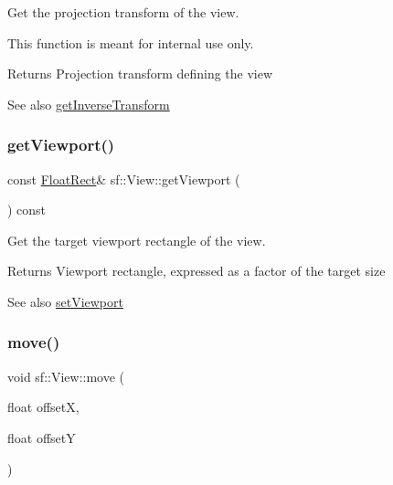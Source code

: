 Get the projection transform of the view. 

This function is meant for internal use only.

\begin{DoxyReturn}{Returns}
Projection transform defining the view
\end{DoxyReturn}
\begin{DoxySeeAlso}{See also}
\mbox{\hyperlink{classsf_1_1_view_acd2b001cf2a646f62e7d9e792d7d5f0d}{get\+Inverse\+Transform}} \begin{DoxyVerb}\end{DoxyVerb}
 
\end{DoxySeeAlso}
\mbox{\label{classsf_1_1_view_a93859b4e2e8c191ec741731211a0fb12}} 
\subsubsection{\texorpdfstring{getViewport()}{getViewport()}}
{\footnotesize\ttfamily const \mbox{\hyperlink{classsf_1_1_rect}{Float\+Rect}}\& sf\+::\+View\+::get\+Viewport (\begin{DoxyParamCaption}{ }\end{DoxyParamCaption}) const}



Get the target viewport rectangle of the view. 

\begin{DoxyReturn}{Returns}
Viewport rectangle, expressed as a factor of the target size
\end{DoxyReturn}
\begin{DoxySeeAlso}{See also}
\mbox{\hyperlink{classsf_1_1_view_a8eaec46b7d332fe834f016d0187d4b4a}{set\+Viewport}} \begin{DoxyVerb}\end{DoxyVerb}
 
\end{DoxySeeAlso}
\mbox{\label{classsf_1_1_view_a0c82144b837caf812f7cb25a43d80c41}} 
\subsubsection{\texorpdfstring{move()}{move()}\hspace{0.1cm}{\footnotesize\ttfamily [1/2]}}
{\footnotesize\ttfamily void sf\+::\+View\+::move (\begin{DoxyParamCaption}\item[{float}]{offsetX,  }\item[{float}]{offsetY }\end{DoxyParamCaption})}



